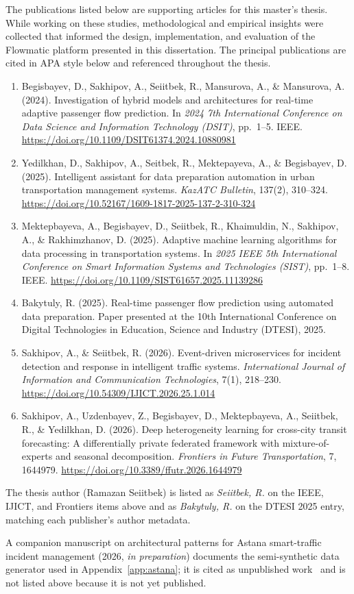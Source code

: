 The publications listed below are supporting articles for this master's thesis. While working on these studies, methodological and empirical insights were collected that informed the design, implementation, and evaluation of the Flowmatic platform presented in this dissertation. The principal publications are cited in APA style below and referenced throughout the thesis.

\begin{enumerate}
  \item Begisbayev, D., Sakhipov, A., Seiitbek, R., Mansurova, A., \& Mansurova, A. (2024). Investigation of hybrid models and architectures for real-time adaptive passenger flow prediction. In \emph{2024 7th International Conference on Data Science and Information Technology (DSIT)}, pp.\ 1--5. IEEE. \url{https://doi.org/10.1109/DSIT61374.2024.10880981}
  \item Yedilkhan, D., Sakhipov, A., Seitbek, R., Mektepayeva, A., \& Begisbayev, D. (2025). Intelligent assistant for data preparation automation in urban transportation management systems. \emph{KazATC Bulletin}, 137(2), 310--324. \url{https://doi.org/10.52167/1609-1817-2025-137-2-310-324}
  \item Mektepbayeva, A., Begisbayev, D., Seiitbek, R., Khaimuldin, N., Sakhipov, A., \& Rakhimzhanov, D. (2025). Adaptive machine learning algorithms for data processing in transportation systems. In \emph{2025 IEEE 5th International Conference on Smart Information Systems and Technologies (SIST)}, pp.\ 1--8. IEEE. \url{https://doi.org/10.1109/SIST61657.2025.11139286}
  \item Bakytuly, R. (2025). Real-time passenger flow prediction using automated data preparation. Paper presented at the 10th International Conference on Digital Technologies in Education, Science and Industry (DTESI), 2025.
  \item Sakhipov, A., \& Seiitbek, R. (2026). Event-driven microservices for incident detection and response in intelligent traffic systems. \emph{International Journal of Information and Communication Technologies}, 7(1), 218--230. \url{https://doi.org/10.54309/IJICT.2026.25.1.014}
  \item Sakhipov, A., Uzdenbayev, Z., Begisbayev, D., Mektepbayeva, A., Seiitbek, R., \& Yedilkhan, D. (2026). Deep heterogeneity learning for cross-city transit forecasting: A differentially private federated framework with mixture-of-experts and seasonal decomposition. \emph{Frontiers in Future Transportation}, 7, 1644979. \url{https://doi.org/10.3389/ffutr.2026.1644979}
\end{enumerate}

\noindent The thesis author (Ramazan Seiitbek) is listed as \emph{Seiitbek, R.} on the IEEE, IJICT, and Frontiers items above and as \emph{Bakytuly, R.} on the DTESI 2025 entry, matching each publisher's author metadata.

\noindent A companion manuscript on architectural patterns for Astana smart-traffic incident management (2026, \emph{in preparation}) documents the semi-synthetic data generator used in Appendix~\ref{app:astana}; it is cited as unpublished work~\cite{bakytuly2026architectural} and is not listed above because it is not yet published.

